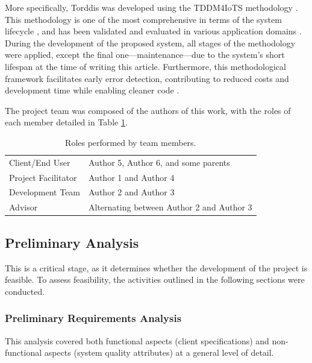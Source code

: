 		More specifically, Torddis was developed using the TDDM4IoTS methodology \citep{Guerrero-Ulloa2020TDDM4IoTS}. This methodology is one of the most comprehensive in terms of the system lifecycle \citep{Guerrero2023Agile}, and has been validated and evaluated in various application domains  \citep{Guerrero-Ulloa2020IoT, Guerrero-Ulloa2022Internet, Guerrero-Ulloa2023DevIdeAir, Guerrero-Ulloa2023SP4, Guerrero-Ulloa2023Nawi}. During the development of the proposed system, all stages of the methodology were applied, except the final one—maintenance—due to the system’s short lifespan at the time of writing this article. Furthermore, this methodological framework facilitates early error detection, contributing to reduced costs and development time while enabling cleaner code \citep{Beck2002TDD}.
		
		The project team was composed of the authors of this work, with the roles of each member detailed in Table \ref{tab:Roles}.
		
		\begin{table}[!htbp]
			\caption{Roles performed by team members.\label{tab:Roles}}
			\centering
			\begin{tabularx}{0.75\textwidth}{>{\raggedright\arraybackslash}p{3.25cm} >{\raggedright\arraybackslash}p{6.5cm}}
				\toprule
				\multicolumn{1}{c}{\textbf{Role}} & \multicolumn{1}{c}{\textbf{Member}} \\
				\midrule
				Client/End User & Author 5, Author 6, and some parents\\
				Project Facilitator & Author 1 and Author 4\\
				Development Team & Author 2 and Author 3\\
				Advisor & Alternating between Author 2 and Author 3\\
				\bottomrule
			\end{tabularx}
		\end{table}
		
		\subsection{Preliminary Analysis}
			This is a critical stage, as it determines whether the development of the project is feasible. To assess feasibility, the activities outlined in the following sections were conducted.
			
			\subsubsection{Preliminary Requirements Analysis}
				This analysis covered both functional aspects (client specifications) and non-functional aspects (system quality attributes) at a general level of detail.
				
